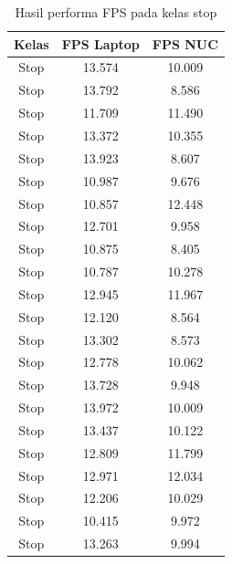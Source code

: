 \begin{longtable}{|c|c|c|}
  \caption{Hasil performa FPS pada kelas stop}
  \label{tb:fpsstop} \\
  \hline
  \rowcolor[HTML]{C0C0C0} 
  \textbf{Kelas} & \textbf{FPS Laptop} & \textbf{FPS NUC} \\ \hline
  Stop           & 13.574              & 10.009           \\ \hline
  Stop           & 13.792              & 8.586            \\ \hline
  Stop           & 11.709              & 11.490           \\ \hline
  Stop           & 13.372              & 10.355           \\ \hline
  Stop           & 13.923              & 8.607            \\ \hline
  Stop           & 10.987              & 9.676            \\ \hline
  Stop           & 10.857              & 12.448           \\ \hline
  Stop           & 12.701              & 9.958            \\ \hline
  Stop           & 10.875              & 8.405            \\ \hline
  Stop           & 10.787              & 10.278           \\ \hline
  Stop           & 12.945              & 11.967           \\ \hline
  Stop           & 12.120              & 8.564            \\ \hline
  Stop           & 13.302              & 8.573            \\ \hline
  Stop           & 12.778              & 10.062           \\ \hline
  Stop           & 13.728              & 9.948            \\ \hline
  Stop           & 13.972              & 10.009           \\ \hline
  Stop           & 13.437              & 10.122           \\ \hline
  Stop           & 12.809              & 11.799           \\ \hline
  Stop           & 12.971              & 12.034           \\ \hline
  Stop           & 12.206              & 10.029           \\ \hline
  Stop           & 10.415              & 9.972            \\ \hline
  Stop           & 13.263              & 9.994            \\ \hline

\end{longtable}
